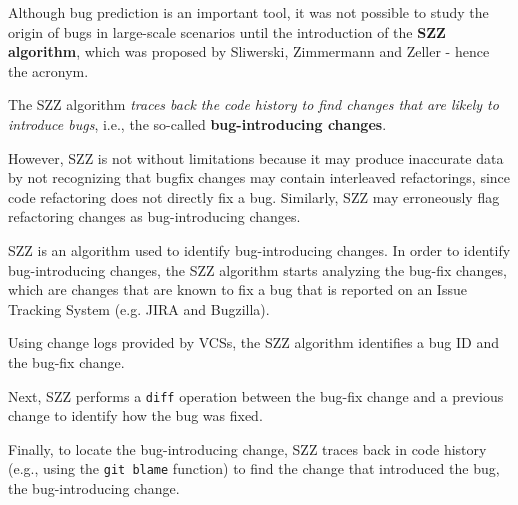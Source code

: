 \documentclass[10pt,a4paper]{article}
\begin{document}
Although bug prediction is an important tool, it was not possible to study the origin of bugs in large-scale scenarios until the introduction of the \textbf{SZZ algorithm}, which was proposed by Sliwerski, Zimmermann and Zeller - hence the acronym. 

The SZZ algorithm \textit{traces back the code history to find changes that are likely to introduce bugs}, i.e., the so-called \textbf{bug-introducing changes}. 

However, SZZ is not without limitations because it may produce inaccurate data by not recognizing that bugfix changes may contain interleaved refactorings, since code refactoring does not directly fix a bug. Similarly, SZZ may erroneously flag refactoring changes as bug-introducing changes. 

SZZ is an algorithm used to identify bug-introducing changes. In order to identify bug-introducing changes, the SZZ algorithm starts analyzing the bug-fix changes, which are changes that are known to fix a bug that is reported on an Issue Tracking System (e.g. JIRA and Bugzilla).

Using change logs provided by VCSs, the SZZ algorithm identifies a bug ID and the bug-fix change. 

Next, SZZ performs a \texttt{diff} operation between the bug-fix change and a previous change to identify how the bug was fixed. 

Finally, to locate the bug-introducing change, SZZ traces back in code history (e.g., using the \texttt{git blame} function) to find the change that introduced the bug, the bug-introducing change.
\end{document}
